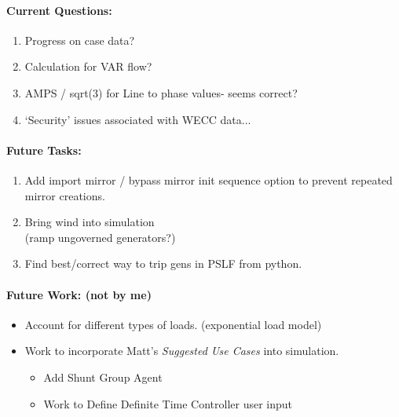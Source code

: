 \documentclass[12pt]{article}
\begin{document}
\begin{multicols}{2}
\begin{enumerate}

	\end{enumerate}

	\paragraph{Current Questions:}
	\begin{enumerate}
\itemsep0em 
	\item Progress on case data?
	\item Calculation for VAR flow?
	\item AMPS / sqrt(3) for Line to phase values- seems correct?
	\item `Security' issues associated with WECC data...
	\end{enumerate}
	
\vfill\null
\columnbreak



\paragraph{Future Tasks:} %
	\begin{enumerate}
		
		\item Add import mirror / bypass mirror init sequence option to prevent repeated mirror creations.

		\item Bring wind into simulation \\ (ramp ungoverned generators?)

		\item Find best/correct way to trip gens in PSLF from python.
		
	\end{enumerate}
\paragraph{Future Work: (not by me)}
\begin{itemize}
\item Account for different types of loads. (exponential load model) %
\item Work to incorporate Matt's \emph{Suggested Use Cases} into simulation.
		\begin{itemize}
		\item Add Shunt Group Agent
		\item Work to Define Definite Time Controller user input
		\end{itemize} 



\end{itemize}
\end{multicols}
\end{document}
